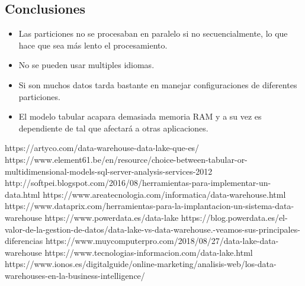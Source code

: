 \documentclass[preprint,12pt]{elsarticle}
\begin{document}
\subsection{Conclusiones}

\begin{itemize}
	\item Las particiones no se procesaban en paralelo si no secuencialmente, lo que hace que sea más lento el procesamiento.
	\item No se pueden usar multiples idiomas.
	\item Si son muchos datos tarda bastante en manejar configuraciones de diferentes particiones.
	\item El modelo tabular acapara demasiada memoria RAM y a su vez es dependiente de tal que afectará a otras aplicaciones.
\end{itemize}



	
	

	
	\newpage
	
	   \begin{thebibliography}{0}
               https://artyco.com/data-warehouse-data-lake-que-es/
               https://www.element61.be/en/resource/choice-between-tabular-or-multidimensional-models-sql-server-analysis-services-2012
               http://softpei.blogspot.com/2016/08/herramientas-para-implementar-un-data.html
 	    https://www.areatecnologia.com/informatica/data-warehouse.html
              https://www.dataprix.com/herramientas-para-la-implantacion-un-sistema-data-warehouse
             https://www.powerdata.es/data-lake
 	  https://blog.powerdata.es/el-valor-de-la-gestion-de-datos/data-lake-vs-data-warehouse.-veamos-sus-principales-diferencias
 	  https://www.muycomputerpro.com/2018/08/27/data-lake-data-warehouse
  	 https://www.tecnologias-informacion.com/data-lake.html
	 https://www.ionos.es/digitalguide/online-marketing/analisis-web/los-data-warehouses-en-la-business-intelligence/



         \end{thebibliography}
	
\end{document}
